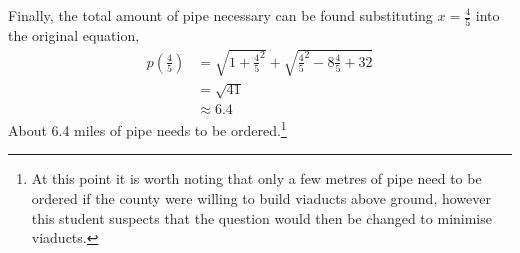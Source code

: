 Finally, the total amount of pipe necessary can be found substituting
$x=\frac{4}{5}$ into the original equation,
\begin{align}
  p(\frac{4}{5}) &= \sqrt{1+\frac{4}{5}^2} + \sqrt{\frac{4}{5}^2 -8\frac{4}{5} +32} \\
  &= \sqrt{41} \\
  &\approx 6.4
\end{align}
About 6.4 miles of pipe needs to be ordered.\footnote{At this point it is
worth noting that only a few metres of pipe need to be ordered if the county
were willing to build viaducts above ground, however this student suspects that
the question would then be changed to minimise viaducts.}\qedbitches
